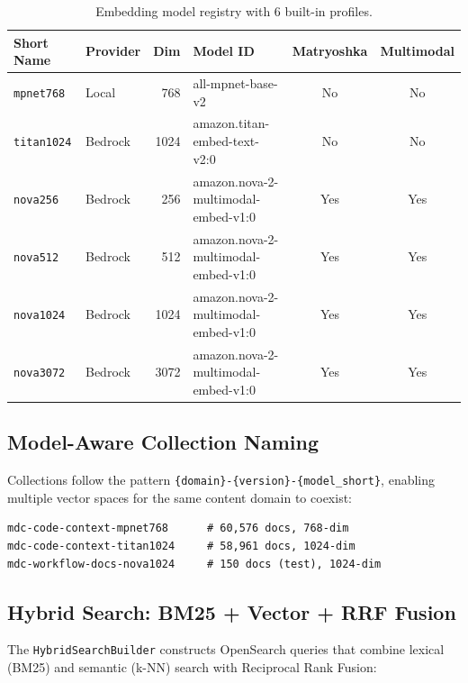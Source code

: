 \documentclass[11pt,letterpaper]{article}
\begin{document}
\begin{table}[H]
\centering
\footnotesize
\begin{tabular}{@{}llrlcc@{}}
\toprule
\textbf{Short Name} & \textbf{Provider} & \textbf{Dim} & \textbf{Model ID} & \textbf{Matryoshka} & \textbf{Multimodal} \\
\midrule
\texttt{mpnet768} & Local & 768 & all-mpnet-base-v2 & No & No \\
\texttt{titan1024} & Bedrock & 1024 & amazon.titan-embed-text-v2:0 & No & No \\
\texttt{nova256} & Bedrock & 256 & amazon.nova-2-multimodal-embed-v1:0 & Yes & Yes \\
\texttt{nova512} & Bedrock & 512 & amazon.nova-2-multimodal-embed-v1:0 & Yes & Yes \\
\texttt{nova1024} & Bedrock & 1024 & amazon.nova-2-multimodal-embed-v1:0 & Yes & Yes \\
\texttt{nova3072} & Bedrock & 3072 & amazon.nova-2-multimodal-embed-v1:0 & Yes & Yes \\
\bottomrule
\end{tabular}
\caption{Embedding model registry with 6 built-in profiles.}
\label{tab:embedding-models}
\end{table}

\subsection{Model-Aware Collection Naming}

Collections follow the pattern \texttt{\{domain\}-\{version\}-\{model\_short\}},
enabling multiple vector spaces for the same content domain to coexist:

\begin{lstlisting}[caption={Model-aware index naming examples.}]
mdc-code-context-mpnet768      # 60,576 docs, 768-dim
mdc-code-context-titan1024     # 58,961 docs, 1024-dim
mdc-workflow-docs-nova1024     # 150 docs (test), 1024-dim
\end{lstlisting}

\subsection{Hybrid Search: BM25 + Vector + RRF Fusion}

The \texttt{HybridSearchBuilder} constructs OpenSearch queries that combine
lexical (BM25) and semantic (k-NN) search with Reciprocal Rank Fusion:
\end{document}
